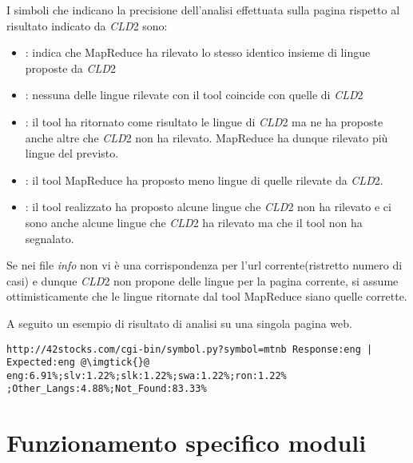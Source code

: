 \documentclass{article}
\newcommand{\MR}{MapReduce}
\newcommand{\cld}{\textit{CLD}2}
\begin{document}
I simboli che indicano la precisione dell'analisi effettuata sulla pagina rispetto al risultato indicato da \cld{} sono:
\begin{itemize}
    \item \imgtick{} : indica che \MR{} ha rilevato lo stesso identico insieme di lingue proposte da \cld{}
    \item \imgx{} : nessuna delle lingue rilevate con il tool coincide con quelle di \cld{}
    \item \imgplus{} : il tool ha ritornato come risultato le lingue di \cld{} ma ne ha proposte anche altre che \cld{} non ha rilevato. \MR{} ha dunque rilevato più lingue del previsto. 
    \item \imgminus{} : il tool \MR{} ha proposto meno lingue di quelle rilevate da \cld{}.
    \item \imgdivided{} : il tool realizzato ha proposto alcune lingue che \cld{} non ha rilevato e ci sono anche alcune lingue che \cld{} ha rilevato ma che il tool non ha segnalato.
\end{itemize}

Se nei file \textit{info} non vi è una corrispondenza per l'url corrente(ristretto numero di casi) e dunque \cld{} non propone delle lingue per la pagina corrente, si assume ottimisticamente che le lingue ritornate dal tool \MR{} siano quelle corrette.

A seguito un esempio di risultato di analisi su una singola pagina web.
\begin{verbatim}
http://42stocks.com/cgi-bin/symbol.py?symbol=mtnb Response:eng |
Expected:eng @\imgtick{}@ eng:6.91%;slv:1.22%;slk:1.22%;swa:1.22%;ron:1.22%
;Other_Langs:4.88%;Not_Found:83.33%
\end{verbatim}

\section{Funzionamento specifico moduli}
\end{document}
